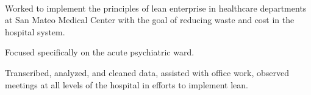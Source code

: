  \\
\begin{tightemize}
\item Worked to implement the principles of lean enterprise in healthcare departments at San Mateo Medical Center with the goal of reducing waste and cost in the hospital system.
\item Focused specifically on the acute psychiatric ward.
\item Transcribed, analyzed, and cleaned data, assisted with office work, observed meetings at all levels of the hospital in efforts to implement lean.
\end{tightemize}

\sectionsep